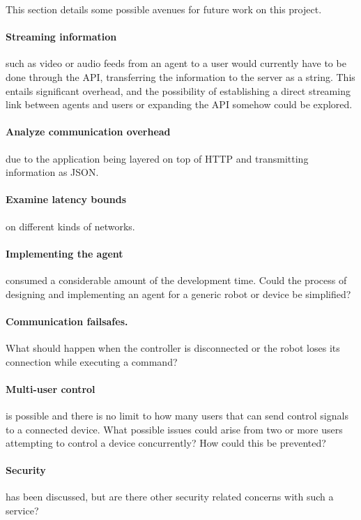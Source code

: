 This section details some possible avenues for future work on this project.

\paragraph{Streaming information} such as video or audio feeds from an agent to a user would currently have to be done through the API, transferring the information to the server as a string.
This entails significant overhead, and the possibility of establishing a direct streaming link between agents and users or expanding the API somehow could be explored.

\paragraph{Analyze communication overhead} due to the application being layered on top of HTTP and transmitting information as JSON.

\paragraph{Examine latency bounds} on different kinds of networks.

\paragraph{Implementing the agent} consumed a considerable amount of the development time.
Could the process of designing and implementing an agent for a generic robot or device be simplified?

\paragraph{Communication failsafes.}
What should happen when the controller is disconnected or the robot loses its connection while executing a command?

\paragraph{Multi-user control} is possible and there is no limit to how many users that can send control signals to a connected device.
What possible issues could arise from two or more users attempting to control a device concurrently?
How could this be prevented?

\paragraph{Security} has been discussed, but are there other security related concerns with such a service?
